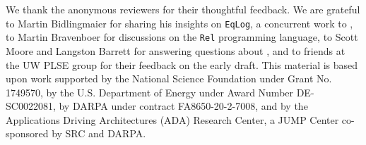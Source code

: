 \documentclass[acmsmall,screen,nonacm]{acmart}
\begin{document}



\maketitle

\renewcommand{\shortauthors}{Y.~Zhang, Y.~R.~Wang, O.~Flatt, D.~Cao, P.~Zucker, E.~Rosenthal, Z.~Tatlock, and M.~Willsey}










\begin{acks}
We thank the anonymous reviewers for their thoughtful feedback.
We are grateful to Martin Bidlingmaier 
 for sharing his insights on \texttt{EqLog}, a concurrent work to \egglog,
 to Martin Bravenboer for discussions on
 the \texttt{Rel} programming language,
 to Scott Moore and Langston Barrett
 for answering questions about \cclyzerpp,
 and to friends at the UW PLSE group 
 for their feedback on the early draft.
  This material is based upon work supported by the National Science Foundation under Grant No. 1749570, by the U.S. Department of Energy under Award Number DE-SC0022081, by DARPA under contract FA8650-20-2-7008, and by the Applications Driving Architectures (ADA) Research Center, a JUMP Center co-sponsored by SRC and DARPA.
\end{acks}



\appendix
\newpage


\end{document}
